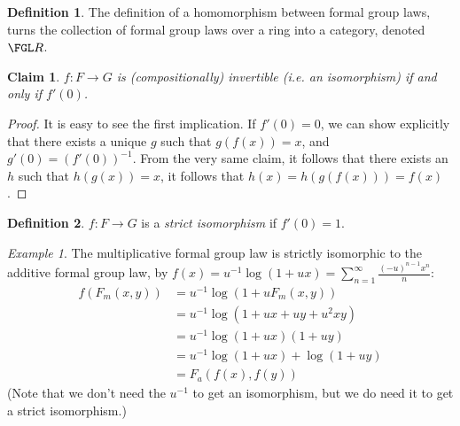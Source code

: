 \documentclass{article}
\newtheorem*{claim*}{Claim}
\theoremstyle{definition}
\newtheorem*{definition*}{Definition}
\theoremstyle{remark}
\newtheorem*{example*}{Example}
\begin{document}
	\begin{definition*}
		The definition of a homomorphism between formal group laws, turns the collection of formal group laws over a ring into a category, denoted $\FGL R$.
	\end{definition*}


	\begin{claim*}
		$f: F \to G$ is (compositionally) invertible (i.e. an isomorphism) if and only if $f'\left(0\right)$.
	\end{claim*}
	
	\begin{proof}
		It is easy to see the first implication.
		If $f'\left(0\right) = 0$, we can show explicitly that there exists a unique $g$ such that $g\left(f\left(x\right)\right) = x$, and $g'\left(0\right) = \left(f'\left(0\right)\right)^{-1}$. From the very same claim, it follows that there exists an $h$ such that $h\left(g\left(x\right)\right) = x$, it follows that $h\left(x\right) = h\left(g\left(f\left(x\right)\right)\right) = f\left(x\right)$.
	\end{proof}

	\begin{definition*}
		$f: F \to G$ is a \emph{strict isomorphism} if $f'\left(0\right)=1$.
	\end{definition*}

	\begin{example*}
		The multiplicative formal group law is strictly isomorphic to the additive formal group law,
		by $f\left(x\right) = u^{-1} \log \left(1+ux\right) = \sum_{n=1}^{\infty} \frac{\left(-u\right)^{n-1} x^n}{n}$:
		\begin{align*}
			f\left(F_m\left(x,y\right)\right)
			&= u^{-1} \log \left(1+u F_m\left(x,y\right)\right)\\
			&= u^{-1} \log \left(1+ux+uy+u^2 xy\right)\\
			&= u^{-1} \log \left(1+ux\right)\left(1+uy\right)\\
			&= u^{-1} \log \left(1+ux\right) + \log \left(1+uy\right)\\
			&= F_a\left(f\left(x\right), f\left(y\right)\right)
		\end{align*}
		(Note that we don't need the $u^{-1}$ to get an isomorphism, but we do need it to get a strict isomorphism.)
	\end{example*}
\end{document}
